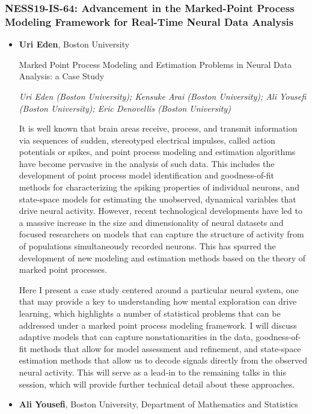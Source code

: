 \subsubsection*{NESS19-IS-64: Advancement in the Marked-Point Process Modeling Framework for Real-Time Neural Data Analysis}

\begin{itemize}
\item \textbf{Uri Eden}, Boston University

Marked Point Process Modeling and Estimation Problems in Neural Data Analysis: a Case Study

\emph{\footnotesize Uri Eden (Boston University); Kensuke Arai (Boston University); Ali Yousefi (Boston University); Eric Denovellis (Boston University)}

It is well known that brain areas receive, process, and transmit information via sequences of sudden, stereotyped electrical impulses, called action potentials or spikes, and point process modeling and estimation algorithms have become pervasive in the analysis of such data. This includes the development of point process model identification and goodness-of-fit methods for characterizing the spiking properties of individual neurons, and state-space models for estimating the unobserved, dynamical variables that drive neural activity. However, recent technological developments have led to a massive increase in the size and dimensionality of neural datasets and focused researchers on models that can capture the structure of activity from of populations simultaneously recorded neurons. This has spurred the development of new modeling and estimation methods based on the theory of marked point processes. 

Here I present a case study centered around a particular neural system, one that may provide a key to understanding how mental exploration can drive learning, which highlights a number of statistical problems that can be addressed under a marked point process modeling framework. I will discuss adaptive models that can capture nonstationarities in the data, goodness-of-fit methods that allow for model assessment and refinement, and state-space estimation methods that allow us to decode signals directly from the observed neural activity. This will serve as a lead-in to the remaining talks in this session, which will provide further technical detail about these approaches.

\item \textbf{Ali Yousefi}, Boston University, Department of Mathematics and Statistics


\end{itemize}
